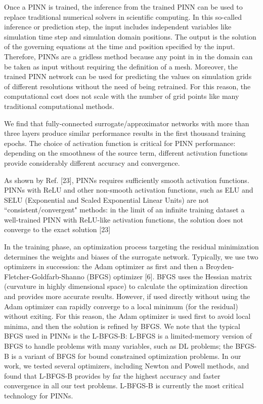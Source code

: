 Once a PINN is trained, the inference from the trained PINN can be used to replace traditional numerical solvers in scientific computing. In this so-called inference or prediction step, the input includes independent variables like simulation time step and simulation domain positions. The output is the solution of the governing equations at the time and position specified by the input. Therefore, PINNs are a gridless method because any point in in the domain can be taken as input without requiring the definition of a mesh. Moreover, the trained PINN network can be used for predicting the values on simulation grids of different resolutions without the need of being retrained. For this reason, the computational cost does not scale with the number of grid points like many traditional computational methods.






We find that
fully-connected surrogate/approximator networks with more than three layers produce similar performance results in
the first thousand training epochs. The choice of activation function is critical for PINN performance: depending on the
smoothness of the source term, different activation functions provide considerably different accuracy and convergence.

As shown by Ref. [23], PINNs requires sufficiently
smooth activation functions. PINNs with ReLU and other non-smooth activation functions, such as ELU and
SELU (Exponential and Scaled Exponential Linear Units) are not “consistent/convergent" methods: in the
limit of an infinite training dataset a well-trained PINN with ReLU-like activation functions, the solution does not
converge to the exact solution [23]

In the training phase, an optimization process targeting the residual minimization determines the weights and
biases of the surrogate network. Typically, we use two optimizers in succession: the Adam optimizer as first and
then a Broyden-Fletcher-Goldfarb-Shanno (BFGS) optimizer [6]. BFGS uses the Hessian matrix (curvature in highly
dimensional space) to calculate the optimization direction and provides more accurate results. However, if used directly
without using the Adam optimizer can rapidly converge to a local minimum (for the residual) without exiting. For this
reason, the Adam optimizer is used first to avoid local minima, and then the solution is refined by BFGS. We note that
the typical BFGS used in PINNs is the L-BFGS-B: L-BFGS is a limited-memory version of BFGS to handle problems with
many variables, such as DL problems; the BFGS-B is a variant of BFGS for bound constrained optimization problems. In
our work, we tested several optimizers, including Newton and Powell methods, and found that L-BFGS-B provides by
far the highest accuracy and faster convergence in all our test problems. L-BFGS-B is currently the most critical
technology for PINNs.

